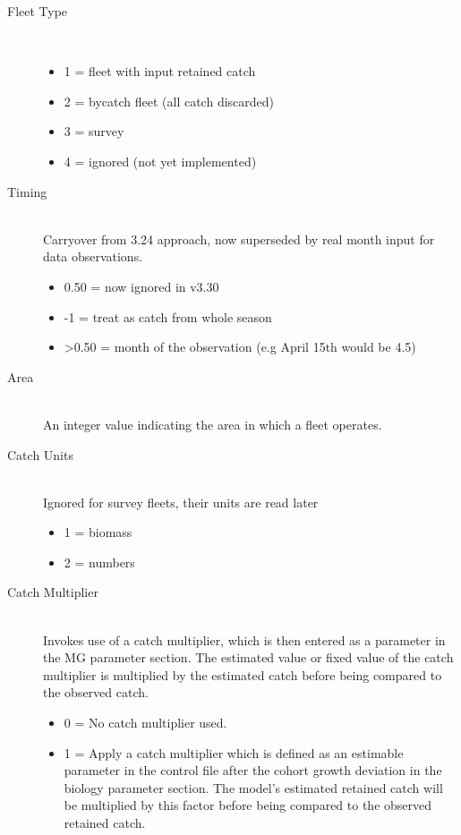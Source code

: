 \begin{description}
  \item[Fleet Type] \ 
	  \begin{itemize}
	  	\item 1 = fleet with input retained catch
	  	\item 2 = bycatch fleet (all catch discarded)
	  	\item 3 = survey
	  	\item 4 = ignored (not yet implemented)
	  \end{itemize}
 \hypertarget{ObsTiming}{}
  \item[Timing]\hfill\\
   Carryover from 3.24 approach, now superseded by real month input for data observations.
	  \begin{itemize}
	  	\item 0.50 = now ignored in v3.30
	  	\item -1 = treat as catch from whole season
	  	\item >0.50 = month of the observation (e.g April 15th would be 4.5)
	  \end{itemize}
  \item[Area]\hfill\\
  An integer value indicating the area in which a fleet operates.
  \item[Catch Units] \hfill\\
  Ignored for survey fleets, their units are read later
	  \begin{itemize}
	  	\item 1 = biomass
	  	\item 2 = numbers
	  \end{itemize}   
  \item[\hypertarget{CatchMult}{Catch Multiplier}] \hfill\\
  Invokes use of a catch multiplier, which is then entered as a parameter in the MG parameter section.  The estimated value or fixed value of the catch multiplier is multiplied by the estimated catch before being compared to the observed catch. 
	  \begin{itemize}
	  	\item 0 = No catch multiplier used.
	  	\item 1 = Apply a catch multiplier which is defined as an estimable parameter in the control file after the cohort growth deviation in the biology parameter section. The model’s estimated retained catch will be multiplied by this factor before being compared to the observed retained catch.
	  \end{itemize}  
\end{description}

